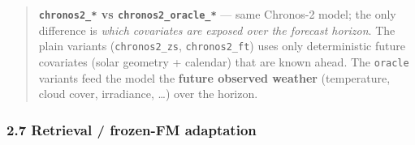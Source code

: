 \documentclass[
  9pt,
]{article}
\begin{document}
\begin{quote}
\textbf{\texttt{chronos2\_\allowbreak{}*} vs \texttt{chronos2\_\allowbreak{}oracle\_\allowbreak{}*}} --- same
Chronos-2 model; the only difference is \emph{which covariates are
exposed over the forecast horizon}. The plain variants
(\texttt{chronos2\_\allowbreak{}zs}, \texttt{chronos2\_\allowbreak{}ft}) uses only deterministic
future covariates (solar geometry + calendar) that are known ahead. The
\texttt{oracle} variants feed the model the \textbf{future observed
weather} (temperature, cloud cover, irradiance, \ldots) over the
horizon.
\end{quote}

\subsubsection{2.7 Retrieval / frozen-FM
adaptation}\label{retrieval-frozen-fm-adaptation}
\end{document}
